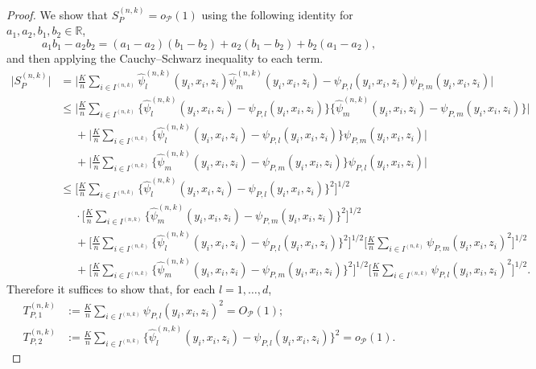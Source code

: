 \documentclass[aos]{imsart}
\newcommand{\R}{\mathbb{R}}
\begin{document}
\begin{proof}
		We show that $S_P^{(n,k)}=o_{\mathcal{P}}(1)$ using the following identity for $a_1, a_2, b_1, b_2 \in \R$,
		\begin{equation*}
			a_1b_1 - a_2b_2 = (a_1-a_2)(b_1-b_2) + a_2(b_1-b_2) + b_2(a_1-a_2),
		\end{equation*}
		and then applying the Cauchy--Schwarz inequality to each term.
		\begin{align*}
			\big|S_P^{(n,k)}\big| &= \bigg| \frac{K}{n} \sum_{i\in I^{(n,k)}} \hat\psi_l^{(n,k)}(y_i,x_i,z_i)\hat\psi_m^{(n,k)}(y_i,x_i,z_i) - \psi_{P,l}(y_i,x_i,z_i)\psi_{P,m}(y_i,x_i,z_i) \bigg|\\
			&\leq \bigg|\frac{K}{n} \sum_{i\in I^{(n,k)}} \Big\{\hat\psi_l^{(n,k)}(y_i,x_i,z_i)-\psi_{P,l}(y_i,x_i,z_i)\Big\}\Big\{\hat\psi_m^{(n,k)}(y_i,x_i,z_i) - \psi_{P,m}(y_i,x_i,z_i)\Big\}\bigg|\\
			&\phantom{=} + \bigg|\frac{K}{n} \sum_{i\in I^{(n,k)}} \Big\{\hat\psi_l^{(n,k)}(y_i,x_i,z_i)-\psi_{P,l}(y_i,x_i,z_i)\Big\} \psi_{P,m}(y_i,x_i,z_i)\bigg|\\
			&\phantom{=} + \bigg|\frac{K}{n} \sum_{i\in I^{(n,k)}} \Big\{\hat\psi_m^{(n,k)}(y_i,x_i,z_i)-\psi_{P,m}(y_i,x_i,z_i)\Big\} \psi_{P,l}(y_i,x_i,z_i)\bigg|\\
			&\leq \bigg[\frac{K}{n} \sum_{i\in I^{(n,k)}} \Big\{\hat\psi_l^{(n,k)}(y_i,x_i,z_i)-\psi_{P,l}(y_i,x_i,z_i)\Big\}^2\bigg]^{1/2} \\
			&\phantom{=} \cdot \bigg[\frac{K}{n} \sum_{i\in I^{(n,k)}}\Big\{\hat\psi_m^{(n,k)}(y_i,x_i,z_i) - \psi_{P,m}(y_i,x_i,z_i)\Big\}^2\bigg]^{1/2}\\
			&\phantom{=} + \bigg[\frac{K}{n} \sum_{i\in I^{(n,k)}} \Big\{\hat\psi_l^{(n,k)}(y_i,x_i,z_i)-\psi_{P,l}(y_i,x_i,z_i)\Big\}^2\bigg]^{1/2} \bigg[\frac{K}{n} \sum_{i\in I^{(n,k)}} \psi_{P,m}(y_i,x_i,z_i)^2\Bigg]^{1/2}\\
			&\phantom{=} + \bigg[\frac{K}{n} \sum_{i\in I^{(n,k)}} \Big\{\hat\psi_m^{(n,k)}(y_i,x_i,z_i)-\psi_{P,m}(y_i,x_i,z_i)\Big\}^2\bigg]^{1/2} \bigg[\frac{K}{n} \sum_{i\in I^{(n,k)}} \psi_{P,l}(y_i,x_i,z_i)^2\bigg]^{1/2}.
		\end{align*}
		Therefore it suffices to show that, for each $l=1,\ldots,d$,
		\begin{align*}
			T_{P,1}^{(n,k)}&:= \frac{K}{n} \sum_{i\in I^{(n,k)}} \psi_{P,l}(y_i,x_i,z_i)^2 = O_{\mathcal{P}}(1);\\
			T_{P,2}^{(n,k)}&:= \frac{K}{n} \sum_{i\in I^{(n,k)}} \Big\{\hat\psi_l^{(n,k)}(y_i,x_i,z_i)-\psi_{P,l}(y_i,x_i,z_i)\Big\}^2 = o_{\mathcal{P}}(1).
		\end{align*}

\end{proof}
\end{document}
